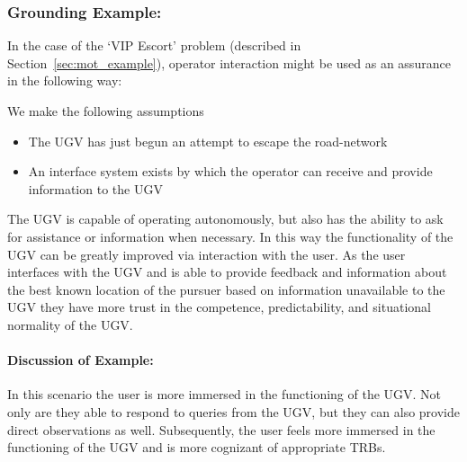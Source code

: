 \subsubsection{Grounding Example:}
In the case of the `VIP Escort' problem (described in Section~\ref{sec:mot_example}), operator interaction might be used as an assurance in the following way:

We make the following assumptions

\begin{itemize}
    \item The UGV has just begun an attempt to escape the road-network
    \item An interface system exists by which the operator can receive and provide information to the UGV
\end{itemize}

The UGV is capable of operating autonomously, but also has the ability to ask for assistance or information when necessary. In this way the functionality of the UGV can be greatly improved via interaction with the user. As the user interfaces with the UGV and is able to provide feedback and information about the best known location of the pursuer based on information unavailable to the UGV they have more trust in the competence, predictability, and situational normality of the UGV.

\paragraph{\textbf{Discussion of Example:}} In this scenario the user is more immersed in the functioning of the UGV. Not only are they able to respond to queries from the UGV, but they can also provide direct observations as well. Subsequently, the user feels more immersed in the functioning of the UGV and is more cognizant of appropriate TRBs.
